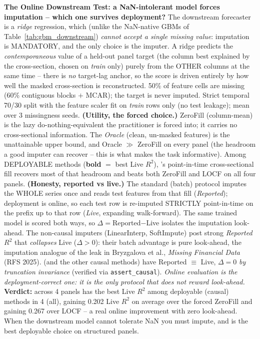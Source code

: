 \begin{table}[tbp]\centering\small
\setlength{\tabcolsep}{6pt}
\caption{\textbf{The Online Downstream Test: a NaN-intolerant model forces imputation -- which one survives deployment?} The downstream forecaster is a \emph{ridge} regression, which (unlike the NaN-native GBMs of Table~\ref{tab:gbm_downstream}) \emph{cannot accept a single missing value}: imputation is MANDATORY, and the only choice is the imputer. A ridge predicts the \emph{contemporaneous} value of a held-out panel target (the column best explained by the cross-section, chosen on \emph{train} only) purely from the OTHER columns at the same time -- there is \emph{no} target-lag anchor, so the score is driven entirely by how well the masked cross-section is reconstructed. 50\% of feature cells are missing (60\% contiguous blocks $+$ MCAR); the target is never imputed. Strict temporal 70/30 split with the feature scaler fit on \emph{train} rows only (no test leakage); mean over 3 missingness seeds. \textbf{(Utility, the forced choice.)} ZeroFill (column-mean) is the lazy do-nothing-equivalent the practitioner is forced into; it carries no cross-sectional information. The \emph{Oracle} (clean, un-masked features) is the unattainable upper bound, and Oracle $\gg$ ZeroFill on every panel (the headroom a good imputer can recover -- this is what makes the task informative). Among DEPLOYABLE methods (\textbf{bold} $=$ best Live $R^2$), \cafe{}'s point-in-time cross-sectional fill recovers most of that headroom and beats both ZeroFill and LOCF on all four panels. \textbf{(Honesty, reported vs live.)} The standard (batch) protocol imputes the WHOLE series once and reads test features from that fill (\emph{Reported}); deployment is online, so each test row is re-imputed STRICTLY point-in-time on the prefix up to that row (\emph{Live}, expanding walk-forward). The same trained model is scored both ways, so $\Delta = $Reported$-$Live isolates the imputation look-ahead. The non-causal imputers (LinearInterp, SoftImpute) post strong \emph{Reported} $R^2$ that \emph{collapses} Live ($\Delta > 0$): their batch advantage is pure look-ahead, the imputation analogue of the leak in Bryzgalova et al., \emph{Missing Financial Data} (RFS 2025). \cafe{} (and the other causal methods) have Reported $\equiv$ Live, $\Delta = 0$ \emph{by truncation invariance} (verified via \texttt{assert\_causal}). \emph{Online evaluation is the deployment-correct one: it is the only protocol that does not reward look-ahead.} \textbf{Verdict:} across 4 panels \cafe{} has the best Live $R^2$ among deployable (causal) methods in 4 (all), gaining 0.202 Live $R^2$ on average over the forced ZeroFill and gaining 0.267 over LOCF -- a real online improvement with zero look-ahead. When the downstream model cannot tolerate NaN you must impute, and \cafe{} is the best deployable choice on structured panels.}

\end{table}
